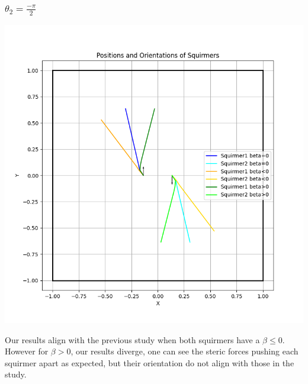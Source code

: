 \documentclass{article}
\begin{document}
\subsubsection{$\theta_2 = \frac{-\pi}{2}$}
\begin{center}
   \includegraphics[width=1\textwidth]{graphs/simulations/twosquirmerinter/sq2.-pi.2.png}
\end{center}
Our results align with the previous study when both squirmers have a $\beta \le 0$.\\
However for $\beta > 0$, our results diverge, one can see the steric forces pushing each squirmer apart 
as expected, but their orientation do not align with those in the study.\\
\end{document}
